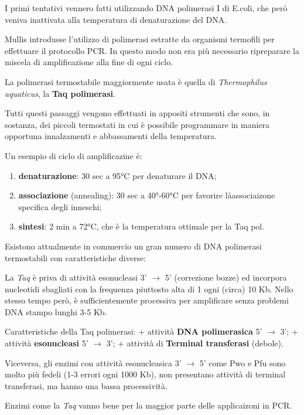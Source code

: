 \documentclass[]{article}
\begin{document}
I primi tentativi vennero fatti utilizzando DNA polimerasi I di E.coli,
che però veniva inattivata alla temperatura di denaturazione del DNA.

Mullis introdusse l'utilizzo di polimerasi estratte da organismi
termofili per effettuare il protocollo PCR. In questo modo non era più
necessario ripreparare la miscela di amplificazione alla fine di ogni
ciclo.

La polimerasi termostabile maggiormente usata è quella di
\emph{Thermophilus aquaticus}, la \textbf{Taq polimerasi}.

Tutti questi passaggi vengono effettuati in appositi strumenti che sono,
in sostanza, dei piccoli termostati in cui è possibile programmare in
maniera opportuna innalzamenti e abbassamenti della temperatura.

Un esempio di ciclo di amplificazine è:

\begin{enumerate}
\def\labelenumi{\arabic{enumi}.}
\itemsep1pt\parskip0pt
\item
  \textbf{denaturazione}: 30 sec a 95°C per denaturare il DNA;
\item
  \textbf{associazione} (annealing): 30 sec a 40°-60°C per favorire
  làassociaizone specifica degli inneschi;
\item
  \textbf{sintesi}: 2 min a 72°C, che è la temperatura ottimale per la
  Taq pol.
\end{enumerate}

Esistono attualmente in commercio un gran numero di DNA polimerasi
termostabili con caratteristiche diverse:

La \emph{Taq} è priva di attività esonucleasi 3' \(\rightarrow\) 5'
(correzione bozze) ed incorpora nucleotidi sbagliati con la frequenza
piuttosto alta di 1 ogni (circa) 10 Kb. Nello stesso tempo però, è
sufficientemente processiva per amplificare senza problemi DNA stampo
lunghi 3-5 Kb.

Caratteristiche della Taq polimerasi: + attività \textbf{DNA
polimerasica} 5' \(\rightarrow\) 3'; + attività \textbf{esonucleasi} 5'
\(\rightarrow\) 3'; + attività di \textbf{Terminal transferasi}
(debole).

Viceversa, gli enzimi con attività esonucleasica 3' \(\rightarrow\) 5'
come Pwo e Pfu sono molto più fedeli (1-3 errori ogni 1000 Kb), non
presentano attività di terminal transferasi, ma hanno una bassa
processività.

Enzimi come la \emph{Taq} vanno bene per la maggior parte delle
applicaizoni in PCR.
\end{document}
